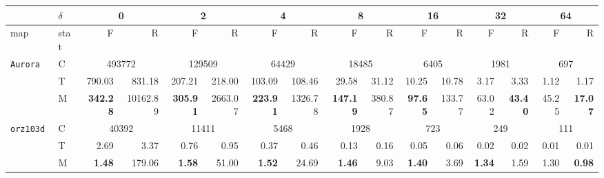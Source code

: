 \begin{table}[bt]
    \centering \scriptsize
\begin{tabular}{ll|r@{~}rr@{~}rr@{~}rr@{~}rr@{~}rr@{~}rr@{~}r}
\toprule
       &$\delta$& \multicolumn{2}{c}{0} & \multicolumn{2}{c}{2} & \multicolumn{2}{c}{4} & \multicolumn{2}{c}{8} & \multicolumn{2}{c}{16} & \multicolumn{2}{c}{32} & \multicolumn{2}{c}{64} \\
\midrule
       map &stat& F     &     R         & F     &    R          & F         &    R      & F     &   R           & F         &   R        & F        &   R         & F           &   R\\
\midrule
 \tt  Aurora &C &\multicolumn{2}{c}{493772}&\multicolumn{2}{c}{129509}&\multicolumn{2}{c}{64429}&\multicolumn{2}{c}{18485}&\multicolumn{2}{c}{6405}&\multicolumn{2}{c}{1981}&\multicolumn{2}{c}{697}\\ 
             &T &  790.03 &  831.18&  207.21 & 218.00 &  103.09 & 108.46 & 29.58 & 31.12& 10.25 & 10.78 & 3.17 & 3.33 & 1.12 & 1.17 \\
             &M & \textbf{342.28 } &10162.89 & \textbf{305.91 } &2663.07 & \textbf{223.91 } &1326.78 &\textbf{ 147.19 } &380.87 &\textbf{ 97.65 }  & 133.77& 63.02 & \textbf{43.40 }& 45.25   & \textbf{17.07} \\ \hline
             
 \tt    orz103d &C &\multicolumn{2}{c}{40392}&\multicolumn{2}{c}{11411}&\multicolumn{2}{c}{5468}&\multicolumn{2}{c}{1928}&\multicolumn{2}{c}{723}&\multicolumn{2}{c}{249}&\multicolumn{2}{c}{111}\\ 
             &T &    2.69 &    3.37   &  0.76 & 0.95 &  0.37 & 0.46 & 0.13 & 0.16 & 0.05 & 0.06 & 0.02 & 0.02 & 0.01 & 0.01 \\
             &M & \textbf{1.48}   & 179.06  & \textbf{1.58}   & 51.00  & \textbf{1.52}   & 24.69  & \textbf{1.46}   & 9.03  & \textbf{1.40 }   & 3.69  & \textbf{1.34 }   & 1.59  & 1.30    & \textbf{0.98} \\ \hline
             

\end{tabular}
\end{table}
